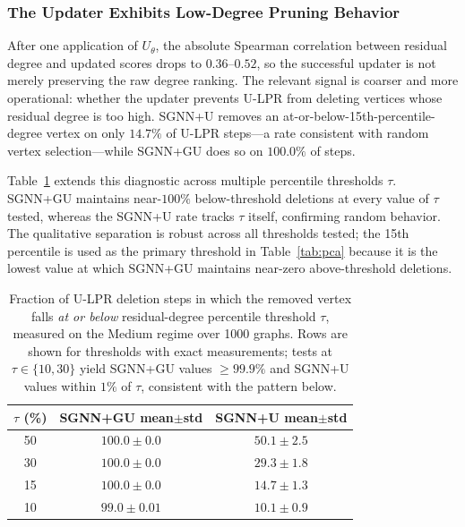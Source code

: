 \documentclass[mathematics,article,submit,pdftex,moreauthors]{Definitions/mdpi}
\begin{document}
\subsubsection{The Updater Exhibits Low-Degree Pruning Behavior}

After one application of $U_\theta$, the absolute Spearman correlation between
residual degree and updated scores drops to $0.36$--$0.52$, so the successful
updater is not merely preserving the raw degree ranking. The relevant signal is
coarser and more operational: whether the updater prevents U-LPR from deleting
vertices whose residual degree is too high. \textsc{SGNN+U} removes an
at-or-below-15th-percentile-degree vertex on only $14.7\%$ of U-LPR steps---a rate
consistent with random vertex selection---while \textsc{SGNN+GU} does so on $100.0\%$
of steps.

Table~\ref{tab:percentile} extends this diagnostic across multiple percentile
thresholds $\tau$. \textsc{SGNN+GU} maintains near-$100\%$ below-threshold deletions
at every value of $\tau$ tested, whereas the \textsc{SGNN+U} rate tracks $\tau$
itself, confirming random behavior. The qualitative separation is robust across all
thresholds tested; the 15th percentile is used as the primary threshold in
Table~\ref{tab:pca} because it is the lowest value at which \textsc{SGNN+GU}
maintains near-zero above-threshold deletions.

\begin{table}[H]
  \caption{Fraction of U-LPR deletion steps in which the removed vertex falls
    \emph{at or below} residual-degree percentile threshold $\tau$, measured on
    the Medium regime over 1000 graphs. Rows are shown for thresholds with exact
    measurements; tests at $\tau\in\{10,30\}$ yield \textsc{SGNN+GU} values
    $\geq99.9\%$ and \textsc{SGNN+U} values within $1\%$ of $\tau$, consistent
  with the pattern below.}
  \label{tab:percentile}
  \centering
  \begin{tabular}{ccc}
    \toprule
    $\tau$ (\%) & \textsc{SGNN+GU} mean$\pm$std & \textsc{SGNN+U} mean$\pm$std \\
    \midrule
    50 & $100.0\pm 0.0$ & $50.1\pm 2.5$ \\
    30 & $100.0\pm 0.0$ & $29.3\pm 1.8$ \\
    15 & $100.0\pm 0.0$ & $14.7\pm 1.3$ \\
    10 & $99.0\pm 0.01$ & $10.1\pm 0.9$ \\
    \bottomrule
  \end{tabular}
\end{table}
\end{document}
